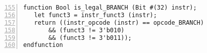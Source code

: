 {\small
\begin{Verbatim}[frame=single, numbers=left, firstnumber=155, label=src\_Common/Instr\_Bits.bsv]
function Bool is_legal_BRANCH (Bit #(32) instr);
   let funct3 = instr_funct3 (instr);
   return ((instr_opcode (instr) == opcode_BRANCH)
	   && (funct3 != 3'b010)
	   && (funct3 != 3'b011));
endfunction
\end{Verbatim}
}
